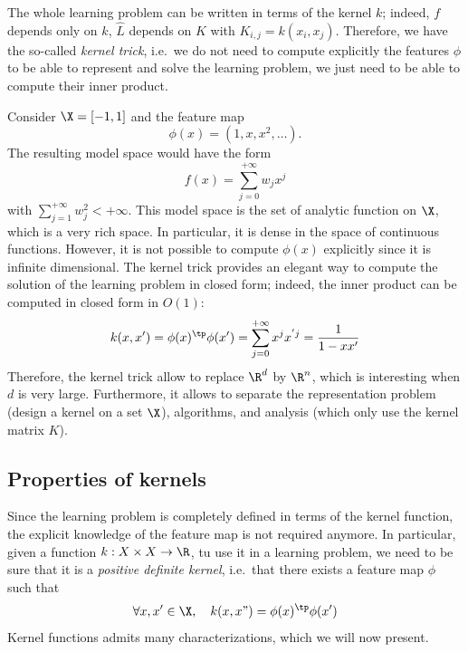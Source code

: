 \documentclass[toc, titlepaged]{../cs-classes/cs-classes}
\begin{document}
\begin{remark}
    The whole learning problem can be written in terms of the kernel $k$; indeed, $f$ depends only on $k$, $\hat{L}$ depends on $K$ with $K_{i, j} = k(x_i, x_j)$. Therefore, we have the so-called \emph{kernel trick}, i.e.~we do not need to compute explicitly the features $\phi$ to be able to represent and solve the learning problem, we just need to be able to compute their inner product.
\end{remark}

\begin{example}
    \leavevmode
    
    Consider $\X=\lbrack-1, 1\rbrack$ and the feature map
    \begin{equation*}
        \phi(x)=(1, x, x^2, \dots).
    \end{equation*}
    The resulting model space would have the form
    \begin{equation*}
        f(x)=\sum_{j=0}^{+\infty}w_jx^j
    \end{equation*}
    with $\sum_{j=1}^{+\infty}w_j^2 < +\infty$. This model space is the set of analytic function on $\X$, which is a very rich space. In particular, it is dense in the space of continuous functions. However, it is not possible to compute $\phi(x)$ explicitly since it is infinite dimensional. The kernel trick provides an elegant way to compute the solution of the learning problem in closed form; indeed, the inner product can be computed in closed form in $O(1)$:
    \begin{equation*}
        k(x, x') = \phi(x)^\tp\phi(x')=\sum_{j=0}^{+\infty}x^jx^{'j} = \frac{1}{1-xx'}
    \end{equation*}
    Therefore, the kernel trick allow to replace $\R^d$ by $\R^n$, which is interesting when $d$ is very large. Furthermore, it allows to separate the representation problem (design a kernel on a set $\X$), algorithms, and analysis (which only use the kernel matrix $K$).
\end{example}

\subsection{Properties of kernels}
Since the learning problem is completely defined in terms of the kernel function, the explicit knowledge of the feature map is not required anymore. In particular, given a function $k:X\times X \to \R$, tu use it in a learning problem, we need to be sure that it is a \emph{positive definite kernel}, i.e.~that there exists a feature map $\phi$ such that
\begin{equation*}
    \forall x, x'\in\X, \quad k(x, x") = \phi(x)^\tp \phi(x')
\end{equation*}
Kernel functions admits many characterizations, which we will now present.
\end{document}
